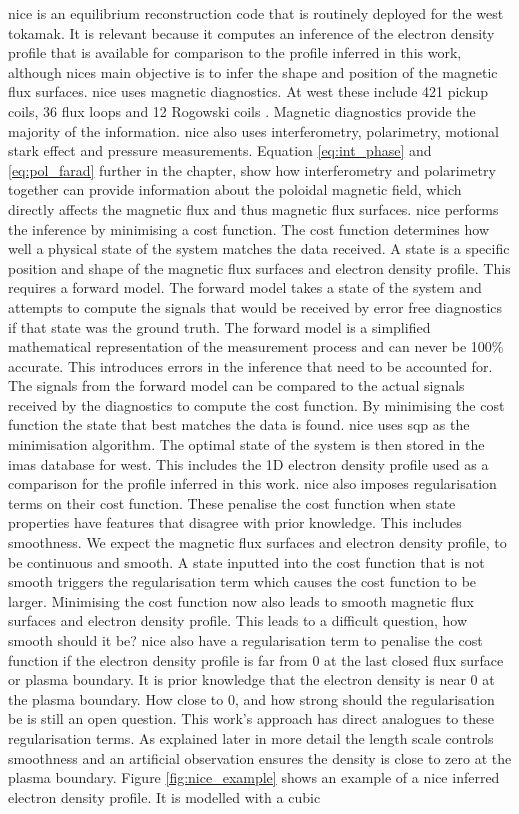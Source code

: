 \gls{nice} is an equilibrium reconstruction code that is routinely deployed for the \gls{west} tokamak. It is relevant because it computes an inference of the electron density profile that is available for comparison to the profile inferred in this work, although \glspl{nice} main objective is to infer the shape and position of the magnetic flux surfaces. \gls{nice} uses magnetic diagnostics. At \gls{west} these include 421 pickup coils, 36 flux loops and 12 Rogowski coils \cite{westmagdiag}. Magnetic diagnostics provide the majority of the information. \gls{nice} also uses interferometry, polarimetry, motional stark effect and pressure measurements. Equation \ref{eq:int_phase} and \ref{eq:pol_farad} further in the chapter, show how interferometry and polarimetry together can provide information about the poloidal magnetic field, which directly affects the magnetic flux and thus magnetic flux surfaces. \gls{nice} performs the inference by minimising a cost function. The cost function determines how well a physical state of the system matches the data received. A state is a specific position and shape of the magnetic flux surfaces and electron density profile. This requires a forward model. The forward model takes a state of the system and attempts to compute the signals that would be received by error free diagnostics if that state was the ground truth. The forward model is a simplified mathematical representation of the measurement process and can never be 100\% accurate. This introduces errors in the inference that need to be accounted for. The signals from the forward model can be compared to the actual signals received by the diagnostics to compute the cost function. By minimising the cost function the state that best matches the data is found. \gls{nice} uses \gls{sqp} as the minimisation algorithm. The optimal state of the system is then stored in the \gls{imas} database for \gls{west}. This includes the 1D electron density profile used as a comparison for the profile inferred in this work. \gls{nice} also imposes regularisation terms on their cost function. These penalise the cost function when state properties have features that disagree with prior knowledge. This includes smoothness. We expect the magnetic flux surfaces and electron density profile, to be continuous and smooth. A state inputted into the cost function that is not smooth triggers the regularisation term which causes the cost function to be larger. Minimising the cost function now also leads to smooth magnetic flux surfaces and electron density profile. This leads to a difficult question, how smooth should it be? \gls{nice} also have a regularisation term to penalise the cost function if the electron density profile is far from 0 at the last closed flux surface or plasma boundary. It is prior knowledge that the electron density is near 0 at the plasma boundary. How close to 0, and how strong should the regularisation be is still an open question. This work's approach has direct analogues to these regularisation terms. As explained later in more detail the length scale controls smoothness and an artificial observation ensures the density is close to zero at the plasma boundary. Figure \ref{fig:nice_example} shows an example of a \gls{nice} inferred electron density profile. It is modelled with a cubic 